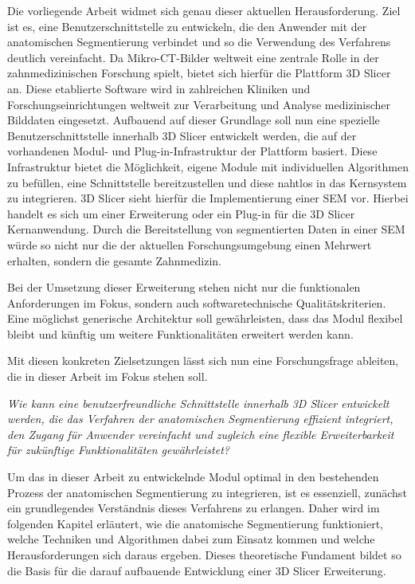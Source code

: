 Die vorliegende Arbeit widmet sich genau dieser aktuellen Herausforderung. Ziel ist
es, eine Benutzerschnittstelle zu entwickeln, die den Anwender mit der anatomischen
Segmentierung verbindet und so die Verwendung des Verfahrens deutlich vereinfacht.
Da Mikro-\ac{CT}-Bilder weltweit eine zentrale Rolle in der zahnmedizinischen Forschung
spielt, bietet sich hierfür die Plattform 3D Slicer an. Diese etablierte Software
wird in zahlreichen Kliniken und Forschungseinrichtungen weltweit zur Verarbeitung
und Analyse medizinischer Bilddaten eingesetzt. Aufbauend auf dieser Grundlage
soll nun eine spezielle Benutzerschnittstelle innerhalb 3D Slicer entwickelt
werden, die auf der vorhandenen Modul- und Plug-in-Infrastruktur der Plattform
basiert. Diese Infrastruktur bietet die Möglichkeit, eigene Module mit
individuellen Algorithmen zu befüllen, eine Schnittstelle bereitzustellen und diese
nahtlos in das Kernsystem zu integrieren. 3D Slicer sieht hierfür die
Implementierung einer \ac{SEM} vor. Hierbei handelt es sich um einer Erweiterung
oder ein Plug-in für die 3D Slicer Kernanwendung. Durch die Bereitstellung von segmentierten
Daten in einer \ac{SEM} würde so nicht nur die der aktuellen Forschungsumgebung
einen Mehrwert erhalten, sondern die gesamte Zahnmedizin.

Bei der Umsetzung dieser Erweiterung stehen nicht nur die funktionalen Anforderungen
im Fokus, sondern auch softwaretechnische Qualitätskriterien. Eine möglichst generische
Architektur soll gewährleisten, dass das Modul flexibel bleibt und künftig um
weitere Funktionalitäten erweitert werden kann.

Mit diesen konkreten Zielsetzungen lässt sich nun eine Forschungsfrage ableiten,
die in dieser Arbeit im Fokus stehen soll.

\begin{center}
	\textit{Wie kann eine benutzerfreundliche Schnittstelle innerhalb 3D Slicer
	entwickelt werden, die das Verfahren der anatomischen Segmentierung effizient integriert,
	den Zugang für Anwender vereinfacht und zugleich eine flexible Erweiterbarkeit
	für zukünftige Funktionalitäten gewährleistet?}
\end{center}

Um das in dieser Arbeit zu entwickelnde Modul optimal in den bestehenden Prozess
der anatomischen Segmentierung zu integrieren, ist es essenziell, zunächst ein
grundlegendes Verständnis dieses Verfahrens zu erlangen. Daher wird im folgenden
Kapitel erläutert, wie die anatomische Segmentierung funktioniert, welche Techniken
und Algorithmen dabei zum Einsatz kommen und welche Herausforderungen sich daraus
ergeben. Dieses theoretische Fundament bildet so die Basis für die darauf
aufbauende Entwicklung einer 3D Slicer Erweiterung.
